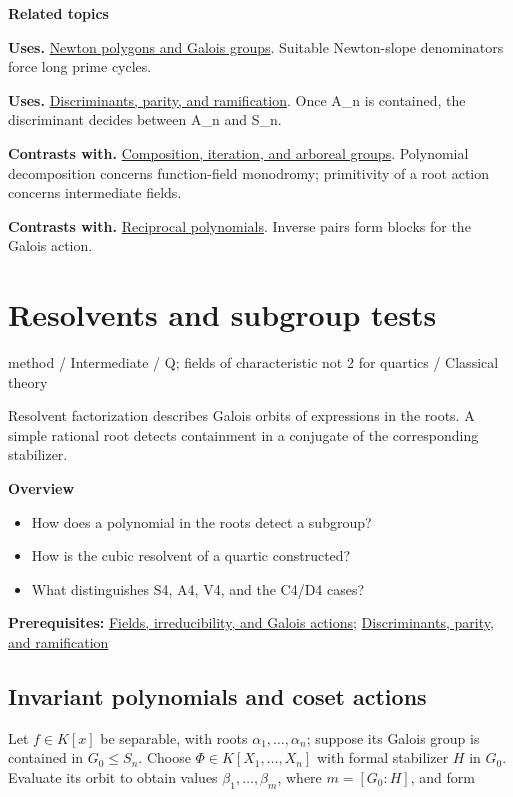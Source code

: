 \documentclass[11pt,a4paper,oneside,openany]{book}
\begin{document}
\par\medskip\begingroup\footnotesize\setlength{\parskip}{1pt}\textbf{\sffamily\color{atlasgreen}Related topics}\par
\color{black}\textbf{Uses.} \hyperlink{article:newton-polygons}{Newton polygons and Galois groups}. Suitable Newton-slope denominators force long prime cycles.\par
\color{black}\textbf{Uses.} \hyperlink{article:discriminants}{Discriminants, parity, and ramification}. Once A\_\allowbreak{}n is contained, the discriminant decides between A\_\allowbreak{}n and S\_\allowbreak{}n.\par
\color{black}\textbf{Contrasts with.} \hyperlink{article:composition-iteration}{Composition, iteration, and arboreal groups}. Polynomial decomposition concerns function-field monodromy; primitivity of a root action concerns intermediate fields.\par
\color{black}\textbf{Contrasts with.} \hyperlink{article:reciprocity}{Reciprocal polynomials}. Inverse pairs form blocks for the Galois action.\par
\endgroup
\chapter{Resolvents and subgroup tests}\label{article:resolvents}\hypertarget{article:resolvents}{}\color{black}
{\sffamily\small\color{atlasgold}method / Intermediate / Q; fields of characteristic not 2 for quartics / Classical theory}\par\medskip
Resolvent factorization describes Galois orbits of expressions in the roots. A simple rational root detects containment in a conjugate of the corresponding stabilizer.\par\medskip
\textbf{Overview}\begin{itemize}
\item How does a polynomial in the roots detect a subgroup?
\item How is the cubic resolvent of a quartic constructed?
\item What distinguishes S4, A4, V4, and the C4/D4 cases?
\end{itemize}
{\small\textbf{Prerequisites:} \hyperlink{article:foundations}{Fields, irreducibility, and Galois actions}; \hyperlink{article:discriminants}{Discriminants, parity, and ramification}}\par
{}\section{Invariant polynomials and coset actions}
\color{black} Let \(f\in K[x]\) be separable, with roots \(\alpha_1,\ldots,\alpha_n\); suppose its Galois group is contained in \(G_0\le S_n\). Choose \(\Phi\in K[X_1,\ldots,X_n]\) with formal stabilizer \(H\) in \(G_0\). Evaluate its orbit to obtain values \(\beta_1,\ldots,\beta_m\), where \(m=[G_0:H]\), and form\par
\end{document}
